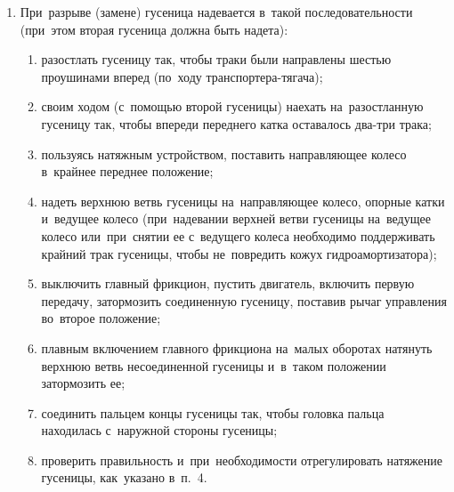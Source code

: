 \begin{enumerate}
        Заменять трак следует на~участке между ведущим колесом и~первым опорным катком в~нижней ветви в~следующем порядке: 
        \begin{enumerate}
            \item ослабить натяжение гусеницы (см.~п.~\ref{item_track_tension}); 
            \item перемещением транспортера-тягача вывести трак, подлежащий удалению, на~наклонную нижнюю ветвь между ведущим колесом и~первым опорным катком; 
            \item затормозить вторую гусеницу; 
            \item на~первой передаче кратковременным включением главного фрикциона натянуть верхнюю ветвь гусеницы с~траком, подлежащим удалению (замене), и~заглушить двигатель; 
            \item выбить пальцы и~удалить (заменить) трак, после чего расклепать пальцы; 
            \item проверить натяжение гусеницы, при~необходимости отрегулировать  (см.~пп.~\ref{item_check_tension} и~\ref{item_track_tension}). 
        \end{enumerate}


    \item При~разрыве (замене) гусеница надевается в~такой последовательности (при~этом вторая гусеница должна быть надета): 


        \begin{enumerate}
            \item разостлать гусеницу так, чтобы траки были направлены шестью проушинами вперед (по~ходу транспортера-тягача); 
            \item своим ходом (с~помощью второй гусеницы) наехать на~разостланную гусеницу так, чтобы впереди переднего катка оставалось два-три трака; 
            \item пользуясь натяжным устройством, поставить направляющее колесо в~крайнее переднее положение; 
            \item надеть верхнюю ветвь гусеницы на~направляющее колесо, опорные катки и~ведущее колесо (при~надевании верхней ветви гусеницы на~ведущее колесо или~при~снятии ее с~ведущего колеса необходимо поддерживать крайний трак гусеницы, чтобы не~повредить кожух гидроамортизатора); 
            \item выключить главный фрикцион, пустить двигатель, включить первую передачу, затормозить соединенную гусеницу, поставив рычаг управления во~второе положение; 
            \item плавным включением главного фрикциона на~малых оборотах натянуть верхнюю ветвь несоединенной гусеницы и~в~таком положении затормозить ее; 
            \item соединить пальцем концы гусеницы так, чтобы головка пальца находилась с~наружной стороны гусеницы; 
            \item проверить правильность и~при~необходимости отрегулировать натяжение гусеницы, как~указано в~п.~4.  
        \end{enumerate}
\end{enumerate}
